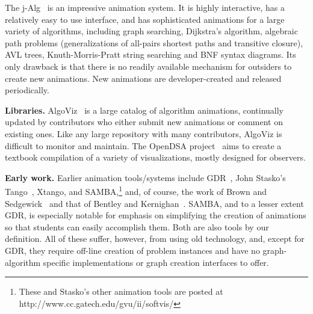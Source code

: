 The j-Alg~\cite{j-Algo} is an impressive animation system.
It is highly interactive, has a relatively easy to use interface, and has sophisticated animations for a large variety of algorithms,
including graph searching, Dijkstra's algorithm,
algebraic path problems (generalizations of all-pairs shortest paths and transitive closure), AVL trees, Knuth-Morris-Pratt string searching and BNF syntax diagrams.
Its only drawback is that there is no readily available mechanism
for outsiders to create new animations.
New animations are developer-created and released periodically.

\textbf{Libraries.}
AlgoViz~\cite{AlgoViz}
is a large catalog of algorithm animations, continually updated by
contributors who either submit new animations or comment on existing ones.
Like any large repository with many contributors, AlgoViz is difficult to
monitor and
maintain.
The OpenDSA project~\cite{%
2011-ProgramVisualization-Shaffer,2011-Koli-Shaffer,2012-SIGCSE-Fouh%
}
aims to create a textbook compilation of a variety of
visualizations, mostly designed for observers.

\textbf{Early work.}
Earlier animation tools/systems include GDR~\cite{1992-CSDM-Stallmann}, John Stasko's
Tango~\cite{1990-Computer-Stasko}, Xtango,
and SAMBA,\footnote{
These and Stasko's other animation tools are posted at
http://www.cc.gatech.edu/gvu/ii/softvis/
} and, of course,
the work of
Brown and Sedgewick~\cite{1988-Computer-Brown,1985-IEEE_Software-Brown}
and that of Bentley and Kernighan~\cite{1987-Animation-Bentley}.
SAMBA, and to a lesser extent GDR, is especially notable for emphasis on simplifying the creation of
animations so that students can easily accomplish them.
Both are also tools by our definition.
All of these suffer, however, from using old technology,
and, except for GDR,
they require off-line creation
of problem instances and have no graph-algorithm specific implementations
or graph creation interfaces to offer.

